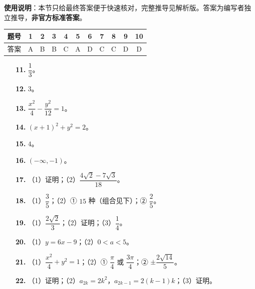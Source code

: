 
\begin{gknotice}
\textbf{使用说明}：本节只给最终答案便于快速核对，完整推导见解析版。答案为编写者独立推导，\textbf{非官方标准答案}。
\end{gknotice}

\begin{center}\begin{tabular}{ccccccccccc}
\toprule
题号 & 1 & 2 & 3 & 4 & 5 & 6 & 7 & 8 & 9 & 10 \\
\midrule
答案 & A & B & B & C & A & D & C & C & D & D \\
\bottomrule
\end{tabular}\end{center}

\begin{itemize}[leftmargin=2.6em]
  \item[\textbf{11.}] $\dfrac13$。
  \item[\textbf{12.}] $3$。
  \item[\textbf{13.}] $\dfrac{x^2}4-\dfrac{y^2}{12}=1$。
  \item[\textbf{14.}] $(x+1)^2+y^2=2$。
  \item[\textbf{15.}] $4$。
  \item[\textbf{16.}] $(-\infty,-1)$。
\end{itemize}

\begin{itemize}[leftmargin=2.6em]
  \item[\textbf{17.}] （1）证明；（2）$\dfrac{4\sqrt2-7\sqrt3}{18}$。
  \item[\textbf{18.}] （1）$\dfrac35$；（2）① $15$ 种（组合见下）；② $\dfrac25$。
  \item[\textbf{19.}] （1）$\dfrac{2\sqrt2}3$；（2）证明；（3）$\dfrac14$。
  \item[\textbf{20.}] （1）$y=6x-9$；（2）$0<a<5$。
  \item[\textbf{21.}] （1）$\dfrac{x^2}4+y^2=1$；（2）① $\dfrac\pi4$ 或 $\dfrac{3\pi}4$；② $\pm\dfrac{2\sqrt{14}}5$。
  \item[\textbf{22.}] （1）证明；（2）$a_{2k}=2k^2$，$a_{2k-1}=2(k-1)k$；（3）证明。
\end{itemize}
